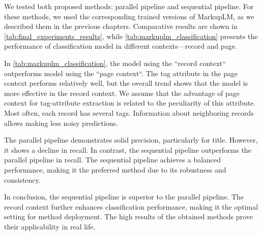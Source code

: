 We tested both proposed methods: parallel pipeline and sequential pipeline. For these methods, we used the corresponding trained versions of MarkupLM, as we described them in the previous chapters. Comparative results are shown in \autoref{tab:final_experiments_results}, while \autoref{tab:markuplm_classification} presents the performance of classification model in different contexts—record and page.

In \autoref{tab:markuplm_classification}, the model using the ``record context`` outperforms model using the ``page context``. The tag attribute in the page context performs relatively well, but the overall trend shows that the model is more effective in the record context. We assume that the advantage of page context for tag-attribute extraction is related to the peculiarity of this attribute. Most often, each record has several tags. Information about neighboring records allows making less noisy predictions.

The parallel pipeline demonstrates solid precision, particularly for title. However, it shows a decline in recall. In contrast, the sequential pipeline outperforms the parallel pipeline in recall. The sequential pipeline achieves a balanced performance, making it the preferred method due to its robustness and consistency.

In conclusion, the sequential pipeline is superior to the parallel pipeline. The record context further enhances classification performance, making it the optimal setting for method deployment. The high results of the obtained methods prove their applicability in real life.
